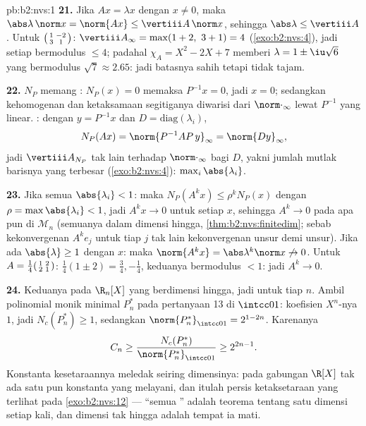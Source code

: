 \begin{solution}{pb:b2:nvs:1}
\textbf{21.} Jika $Ax = \lambda x$ dengan $x \neq 0$, maka
$\abs\lambda\,\norm x = \norm{Ax} \leq \vertiii A\,\norm x$,
sehingga $\abs\lambda \leq \vertiii A$. Untuk
$\begin{psmallmatrix}1 & -2\\ 3 & 1\end{psmallmatrix}$:
$\vertiii A_\infty = \max(1 + 2,\ 3 + 1) = 4$
(\cref{exo:b2:nvs:4}), jadi setiap  bermodulus $\leq
4$; padahal $\chi_A = X^2 - 2X + 7$ memberi $\lambda = 1 \pm
\iu\sqrt6$ yang bermodulus $\sqrt7 \approx 2.65$: jadi batasnya
sahih tetapi tidak tajam.

\textbf{22.} $N_P$ memang : $N_P(x) = 0$ memaksa $P^{-1}x = 0$,
jadi $x = 0$; sedangkan kehomogenan dan ketaksamaan segitiganya diwarisi
dari $\norm\cdot_\infty$ lewat $P^{-1}$ yang linear. : dengan $y = P^{-1}x$ dan $D = \mathrm{diag}(\lambda_i)$,
\[
N_P(Ax) = \norm{P^{-1}AP\,y}_\infty = \norm{Dy}_\infty,
\]
jadi $\vertiii A_{N_P}$ tak lain  terhadap
$\norm\cdot_\infty$ bagi $D$, yakni jumlah mutlak barisnya yang terbesar
(\cref{exo:b2:nvs:4}): $\max_i\abs{\lambda_i}$.

\textbf{23.} Jika semua $\abs{\lambda_i} < 1$: maka $N_P(A^kx) \leq
\rho^kN_P(x)$ dengan $\rho = \max\abs{\lambda_i} < 1$, jadi $A^kx
\to 0$ untuk setiap $x$, sehingga $A^k \to 0$ pada  apa pun di
$\mathcal{M}_n$ (semuanya  dalam dimensi hingga,
\cref{thm:b2:nvs:finitedim}; sebab kekonvergenan $A^ke_j$ untuk tiap
$j$ tak lain kekonvergenan unsur demi unsur). Jika ada $\abs{\lambda}
\geq 1$ dengan  $x$: maka $\norm{A^kx} =
\abs\lambda^k\norm x \not\to 0$. Untuk $A =
\frac14\begin{psmallmatrix}1 & 2\\ 2 & 1\end{psmallmatrix}$:  $\frac14(1 \pm 2) = \frac34, -\frac14$, keduanya bermodulus
$< 1$: jadi $A^k \to 0$.

\textbf{24.} Keduanya  pada $\R_n[X]$ yang berdimensi
hingga, jadi  untuk tiap $n$. Ambil polinomial monik
minimal $P^*_n$ pada pertanyaan 13 di $\intcc01$: koefisien
$X^n$-nya $1$, jadi $N_c(P^*_n) \geq 1$, sedangkan
$\norm{P^*_n}_{\intcc01} = 2^{1-2n}$. Karenanya
\[
C_n \geq \frac{N_c(P^*_n)}{\norm{P^*_n}_{\intcc01}}
\geq 2^{2n-1} .
\]
Konstanta kesetaraannya meledak seiring dimensinya: pada
gabungan $\R[X]$ tak ada satu pun konstanta yang melayani, dan itulah
persis ketaksetaraan yang terlihat pada \cref{exo:b2:nvs:12} --- ``semua
'' adalah teorema tentang satu dimensi setiap kali,
dan dimensi tak hingga adalah tempat ia mati.


\end{solution}
